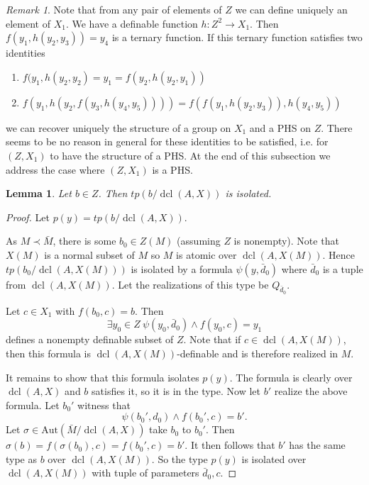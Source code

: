 \documentclass{amsart}
\newtheorem{lemma}[theorem]{Lemma}
\theoremstyle{definition}
\theoremstyle{remark}
\newtheorem{remark}[theorem]{Remark}
\numberwithin{equation}{section}
\def \tp {tp}
\def \aut {\text{Aut}}
\def \dcl {\operatorname{dcl}}
\begin{document}
\begin{remark}
    Note that from any pair of elements of $Z$ we can define uniquely an element of $X_1$. We have a definable function $h:Z^2 \to X_1$. Then $f(y_1, h(y_2,y_3)) = y_4$ is a ternary function. If this ternary function satisfies two identities
    \begin{enumerate}
        \item $f(y_1,h(y_2,y_2) = y_1 = f(y_2,h(y_2,y_1))$
        \item $f(y_1,h(y_2,f(y_3,h(y_4,y_5)))) = f(f(y_1,h(y_2,y_3)),h(y_4,y_5))$
    \end{enumerate}
    we can recover uniquely the structure of a group on $X_1$ and a PHS on $Z$. There seems to be no reason in general for these identities to be satisfied, i.e. for $(Z,X_1)$ to have the structure of a PHS. At the end of this subsection we address the case where $(Z,X_1)$ is a PHS.
\end{remark}

\begin{lemma}\label{lem: isol fund sys}
    Let $b \in Z$. Then $\tp(b/\dcl(A,X))$ is isolated.   
\end{lemma}

\begin{proof}
    Let $p(y) = \tp(b/\dcl(A,X))$. 
    
    As $M \prec \bar{M}$, there is some $b_0 \in Z(M)$ (assuming $Z$ is nonempty). Note that $X(M)$ is a normal subset of $M$ so $M$ is atomic over $\dcl(A,X(M))$. Hence $\tp(b_0/\dcl(A,X(M)))$ is isolated by a formula $\psi(y,\bar{d}_0)$ where $\bar{d}_0$ is a tuple from $\dcl(A,X(M))$. Let the realizations of this type be $Q_{\bar{d}_0}$. 
    
    Let $c \in X_1$ with $f(b_0,c) = b$. Then $$  \exists y_0 \in Z \  \psi(y_0,\bar{d}_0) \wedge f(y_0,c)= y_1$$ defines a nonempty definable subset of $Z$. Note that if $c \in \dcl(A,X(M))$, then this formula is $\dcl(A,X(M))$-definable and is therefore realized in $M$. 
    
    It remains to show that this formula isolates $p(y)$. The formula is clearly over $\dcl(A,X)$ and $b$ satisfies it, so it is in the type. Now let $b'$ realize the above formula. Let $b_0'$ witness that $$\psi(b_0',d_0) \wedge f(b_0',c) = b'.$$ Let $\sigma \in \aut(\bar{M}/\dcl(A,X))$ take $b_0$ to $b_0'$. Then $\sigma(b) = f(\sigma(b_0),c) = f(b_0',c) = b'$. It then follows that $b'$ has the same type as $b$ over $\dcl(A,X(M))$. So the type $p(y)$ is isolated over $\dcl(A,X(M))$ with tuple of parameters $\bar{d}_0,c$.
\end{proof}
\end{document}
